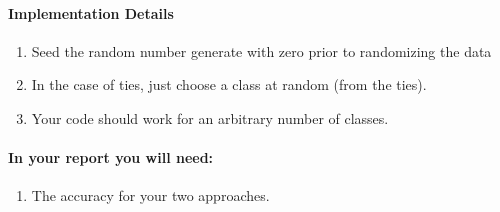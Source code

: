 \documentclass[12pt]{article}
\begin{document}
\paragraph{Implementation Details}
\begin{enumerate}
\item Seed the random number generate with zero prior to randomizing the data
\item In the case of ties, just choose a class at random (from the ties).
\item Your code should work for an arbitrary number of classes.
\end{enumerate}


\paragraph{In your report you will need:}
\begin{enumerate}
\item The accuracy for your two approaches.
\end{enumerate}
\end{document}
